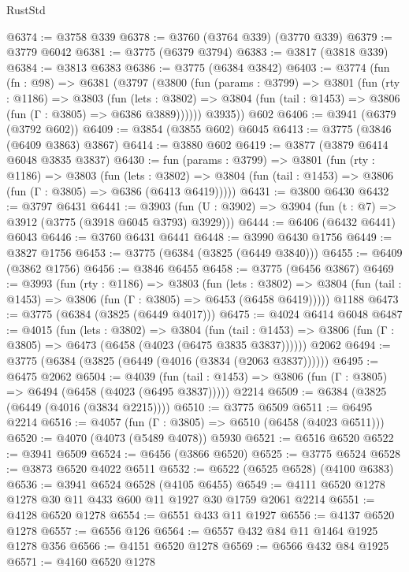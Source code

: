 \begin{lexlean}{RustStd}
\begin{coremodule}
@6374 := @3758 @339
@6378 := @3760 (@3764 @339) (@3770 @339)
@6379 := @3779 @6042
@6381 := @3775 (@6379 @3794)
@6383 := @3817 (@3818 @339)
@6384 := @3813 @6383
@6386 := @3775 (@6384 @3842)
@6403 := @3774
    (fun (fn : @98) =>
    @6381
      (@3797
        (@3800
          (fun (params : @3799) =>
          @3801
            (fun (rty : @1186) =>
            @3803
              (fun (lets : @3802) =>
              @3804 (fun (tail : @1453) => @3806 (fun (Γ : @3805) => @6386 @3889))))))
        @3935))
    @602
@6406 := @3941 (@6379 (@3792 @602))
@6409 := @3854 (@3855 @602) @6045
@6413 := @3775 (@3846 (@6409 @3863) @3867)
@6414 := @3880 @602
@6419 := @3877 (@3879 @6414 @6048 @3835 @3837)
@6430 := fun (params : @3799) =>
  @3801
    (fun (rty : @1186) =>
    @3803
      (fun (lets : @3802) =>
      @3804 (fun (tail : @1453) => @3806 (fun (Γ : @3805) => @6386 (@6413 @6419)))))
@6431 := @3800 @6430
@6432 := @3797 @6431
@6441 := @3903 (fun (U : @3902) => @3904 (fun (t : @7) => @3912 (@3775 (@3918 @6045 @3793) @3929)))
@6444 := @6406 (@6432 @6441) @6043
@6446 := @3760 @6431 @6441
@6448 := @3990 @6430 @1756
@6449 := @3827 @1756
@6453 := @3775 (@6384 (@3825 (@6449 @3840)))
@6455 := @6409 (@3862 @1756)
@6456 := @3846 @6455
@6458 := @3775 (@6456 @3867)
@6469 := @3993
    (fun (rty : @1186) =>
    @3803
      (fun (lets : @3802) =>
      @3804 (fun (tail : @1453) => @3806 (fun (Γ : @3805) => @6453 (@6458 @6419)))))
    @1188
@6473 := @3775 (@6384 (@3825 (@6449 @4017)))
@6475 := @4024 @6414 @6048
@6487 := @4015
    (fun (lets : @3802) =>
    @3804
      (fun (tail : @1453) => @3806 (fun (Γ : @3805) => @6473 (@6458 (@4023 (@6475 @3835 @3837))))))
    @2062
@6494 := @3775 (@6384 (@3825 (@6449 (@4016 (@3834 (@2063 @3837))))))
@6495 := @6475 @2062
@6504 := @4039
    (fun (tail : @1453) => @3806 (fun (Γ : @3805) => @6494 (@6458 (@4023 (@6495 @3837)))))
    @2214
@6509 := @6384 (@3825 (@6449 (@4016 (@3834 @2215))))
@6510 := @3775 @6509
@6511 := @6495 @2214
@6516 := @4057 (fun (Γ : @3805) => @6510 (@6458 (@4023 @6511)))
@6520 := @4070 (@4073 (@5489 @4078)) @5930
@6521 := @6516 @6520
@6522 := @3941 @6509
@6524 := @6456 (@3866 @6520)
@6525 := @3775 @6524
@6528 := @3873 @6520 @4022 @6511
@6532 := @6522 (@6525 @6528) (@4100 @6383)
@6536 := @3941 @6524 @6528 (@4105 @6455)
@6549 := @4111 @6520 @1278 @1278 @30 @11 @433 @600 @11 @1927 @30 @1759 @2061 @2214
@6551 := @4128 @6520 @1278
@6554 := @6551 @433 @11 @1927
@6556 := @4137 @6520 @1278
@6557 := @6556 @126
@6564 := @6557 @432 @84 @11 @1464 @1925 @1278 @356
@6566 := @4151 @6520 @1278
@6569 := @6566 @432 @84 @1925
@6571 := @4160 @6520 @1278

\end{coremodule}
\end{lexlean}
